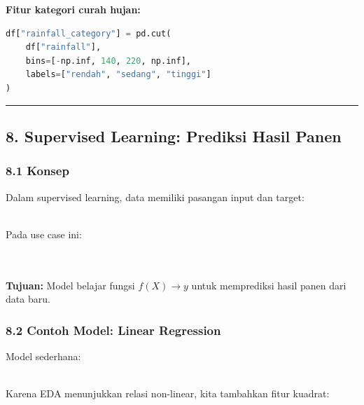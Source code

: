 \documentclass[12pt,a4paper]{article}
\begin{document}
\textbf{Fitur kategori curah hujan:}


\begin{lstlisting}[language=Python]
df["rainfall_category"] = pd.cut(
    df["rainfall"],
    bins=[-np.inf, 140, 220, np.inf],
    labels=["rendah", "sedang", "tinggi"]
)
\end{lstlisting}

\hrule


\subsection{8. Supervised Learning: Prediksi Hasil Panen}

\subsubsection{8.1 Konsep}

Dalam supervised learning, data memiliki pasangan input dan target:


\\[
(X, y)
\\]


Pada use case ini:


\\[
X = \{\text{curah hujan}, \text{suhu}, \text{kelembaban}, \text{pupuk}, \text{luas lahan}\}
\\]


\\[
y = \text{hasil panen}
\\]


\textbf{Tujuan:} Model belajar fungsi $f(X) \rightarrow y$ untuk memprediksi hasil panen dari data baru.


\subsubsection{8.2 Contoh Model: Linear Regression}

Model sederhana:


\\[
\hat{y} = \beta_0 + \beta_1 x_1 + \beta_2 x_2 + \dots + \beta_p x_p
\\]


Karena EDA menunjukkan relasi non-linear, kita tambahkan fitur kuadrat:


\\[
\hat{y} = \beta_0 + \beta_1 \cdot \text{rainfall} + \beta_2 \cdot \text{rainfall}^2 + \dots
\\]
\end{document}
